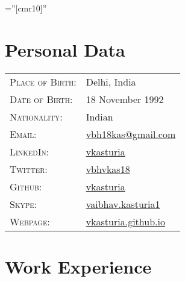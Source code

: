 \documentclass[a4paper,10pt]{article} %
\begin{document}
\pagestyle{empty} %

\font\fb=''[cmr10]'' %


\par{\bigskip\par} %

\section{Personal Data}

\begin{tabular}{ll}
\textsc{Place of Birth:} & Delhi, India \\ 
\textsc{Date of Birth:} & 18 November 1992 \\
\textsc{Nationality:} & Indian\\
\textsc{Email:} & \href{mailto:vbh18kas@gmail.com}{vbh18kas@gmail.com} \\
\textsc{LinkedIn:} & \href{https://www.linkedin.com/in/vkasturia/}{vkasturia} \\
\textsc{Twitter:} & \href{https://twitter.com/vbhvkas18}{vbhvkas18} \\
\textsc{Github:} & \href{https://github.com/vkasturia}{vkasturia} \\
\textsc{Skype:} & \href{https://join.skype.com/invite/apwT2EQ6iqFR}{vaibhav.kasturia1} \\
\textsc{Webpage:} & \href{https://vkasturia.github.io}{vkasturia.github.io}
\end{tabular}


\section{Work Experience}
\end{document}
